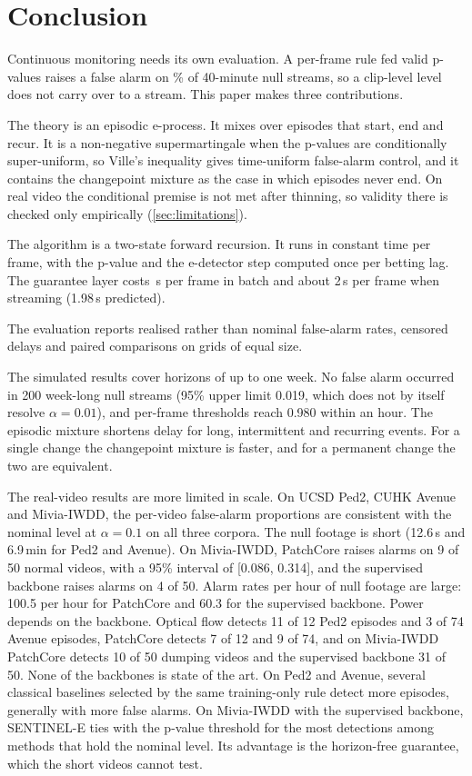 \section{Conclusion}
\label{sec:conclusion}

Continuous monitoring needs its own evaluation. A per-frame rule fed valid p-values raises a false alarm on \ValidityPfaPvaluePct\% of 40-minute null streams, so a clip-level level does not carry over to a stream. This paper makes three contributions.

The theory is an episodic e-process. It mixes over episodes that start, end and recur. It is a non-negative supermartingale when the p-values are conditionally super-uniform, so Ville's inequality gives time-uniform false-alarm control, and it contains the changepoint mixture as the case in which episodes never end. On real video the conditional premise is not met after thinning, so validity there is checked only empirically (\cref{sec:limitations}).

The algorithm is a two-state forward recursion. It runs in constant time per frame, with the p-value and the e-detector step computed once per betting lag. The guarantee layer costs \CostSentinelUs\,\textmu s per frame in batch and about 2\,\textmu s per frame when streaming (1.98\,\textmu s predicted).

The evaluation reports realised rather than nominal false-alarm rates, censored delays and paired comparisons on grids of equal size.

The simulated results cover horizons of up to one week. No false alarm occurred in 200 week-long null streams (95\% upper limit 0.019, which does not by itself resolve $\alpha=0.01$), and per-frame thresholds reach 0.980 within an hour. The episodic mixture shortens delay for long, intermittent and recurring events. For a single change the changepoint mixture is faster, and for a permanent change the two are equivalent.

The real-video results are more limited in scale. On UCSD Ped2, CUHK Avenue and Mivia-IWDD, the per-video false-alarm proportions are consistent with the nominal level at $\alpha=0.1$ on all three corpora. The null footage is short (12.6\,s and 6.9\,min for Ped2 and Avenue). On Mivia-IWDD, PatchCore raises alarms on 9 of 50 normal videos, with a 95\% interval of [0.086, 0.314], and the supervised backbone raises alarms on 4 of 50. Alarm rates per hour of null footage are large: 100.5 per hour for PatchCore and 60.3 for the supervised backbone. Power depends on the backbone. Optical flow detects 11 of 12 Ped2 episodes and 3 of 74 Avenue episodes, PatchCore detects 7 of 12 and 9 of 74, and on Mivia-IWDD PatchCore detects 10 of 50 dumping videos and the supervised backbone 31 of 50. None of the backbones is state of the art. On Ped2 and Avenue, several classical baselines selected by the same training-only rule detect more episodes, generally with more false alarms. On Mivia-IWDD with the supervised backbone, SENTINEL-E ties with the p-value threshold for the most detections among methods that hold the nominal level. Its advantage is the horizon-free guarantee, which the short videos cannot test.

